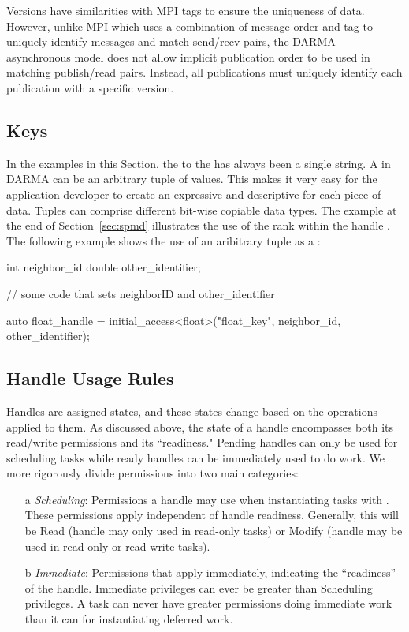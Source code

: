 Versions have similarities with MPI tags to ensure the uniqueness of data.
However, unlike MPI which uses a combination of message order and tag to uniquely identify messages and match send/recv pairs,
the DARMA asynchronous model does not allow implicit publication order to be used in matching publish/read pairs.
Instead, all publications must uniquely identify each publication with a specific version.


\subsection{Keys}
\label{subsec:keys}
In the examples in this Section, the  to the
\ahandleT has always been a single string. 
A  in DARMA 
can be an arbitrary \gls{tuple} of values.  This 
makes it very easy for the application developer to create an expressive
and descriptive  for each piece of data.  Tuples can comprise
different bit-wise copiable data types.  The example at the end of
Section~\ref{sec:spmd} illustrates the use of the \gls{rank} within the handle
.  The following example shows the use of an
aribitrary \gls{tuple} as a :
\begin{CppCode}
  int neighbor_id
  double other_identifier;

  // some code that sets neighborID and other_identifier
  
  auto float_handle = initial_access<float>("float_key", 
                                            neighbor_id, 
                                            other_identifier);
\end{CppCode}

\subsection{Handle Usage Rules}
\label{sec:handlerules}
Handles are assigned states, and these states change 
based on the operations applied to them.  
As discussed above, the state of a handle encompasses both its read/write permissions and its ``readiness."
Pending handles can only be used for scheduling tasks while ready handles can be immediately used to do work.
We more rigorously divide permissions into two main categories: 
\begin{itemize}
\item[a] {\it Scheduling}: Permissions a handle may use when instantiating tasks with .
These permissions apply independent of handle readiness. 
Generally, this will be Read (handle may only used in read-only tasks) or Modify (handle may be used in read-only or read-write tasks). 
\item[b] {\it Immediate}: Permissions that apply immediately, indicating the ``readiness'' of the handle.  Immediate privileges can ever be greater than Scheduling privileges.
A task can never have greater permissions doing immediate work than it can for instantiating deferred work.
\end{itemize}

